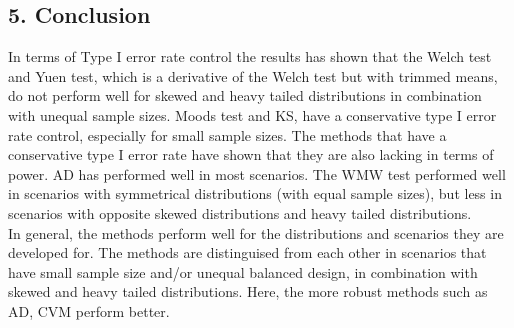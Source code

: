 \documentclass[
]{article}
\begin{document}
\hypertarget{conclusion}{%
\subsection{5. Conclusion}\label{conclusion}}

In terms of Type I error rate control the results has shown that the
Welch test and Yuen test, which is a derivative of the Welch test but
with trimmed means, do not perform well for skewed and heavy tailed
distributions in combination with unequal sample sizes. Moods test and
KS, have a conservative type I error rate control, especially for small
sample sizes. The methods that have a conservative type I error rate
have shown that they are also lacking in terms of power. AD has
performed well in most scenarios. The WMW test performed well in
scenarios with symmetrical distributions (with equal sample sizes), but
less in scenarios with opposite skewed distributions and heavy tailed
distributions.\\
In general, the methods perform well for the distributions and scenarios
they are developed for. The methods are distinguised from each other in
scenarios that have small sample size and/or unequal balanced design, in
combination with skewed and heavy tailed distributions. Here, the more
robust methods such as AD, CVM perform better.
\end{document}
